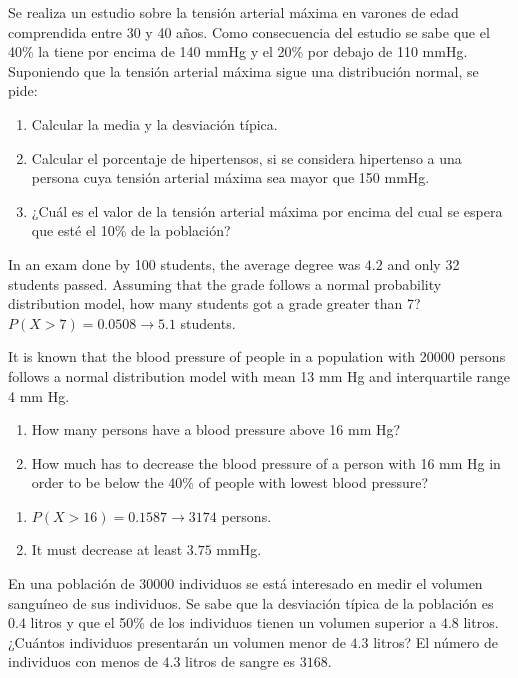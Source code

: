 {Se realiza un estudio sobre la tensión arterial máxima en varones de edad comprendida entre 30 y 40 años. Como
consecuencia del estudio se sabe que el 40\% la tiene por encima de 140 mmHg y el 20\% por debajo de 110 mmHg.
Suponiendo que la tensión arterial máxima sigue una distribución normal, se pide:
\begin{enumerate}
\item Calcular la media y la desviación típica.
\item Calcular el porcentaje de hipertensos, si se considera hipertenso a una persona cuya tensión arterial máxima sea mayor que 150 mmHg.
\item ¿Cuál es el valor de la tensión arterial máxima por encima del cual se espera que esté el 10\% de la población?
\end{enumerate}
}
{}
{}


{In an exam done by 100 students, the average degree was $4.2$ and only 32 students passed.
Assuming that the grade follows a normal probability distribution model, how many students got a grade greater than 7?
}
{$P(X>7)=0.0508\rightarrow 5.1$ students.
}
{}


{It is known that the blood pressure of people in a population with 20000 persons follows a normal distribution
model with mean 13 mm Hg and interquartile range 4 mm Hg.
\begin{enumerate}
\item How many persons have a blood pressure above 16 mm Hg?
\item How much has to decrease the blood pressure of a person with 16 mm Hg in order to be below the 40\% of
people with lowest blood pressure?
\end{enumerate}
}
{
\begin{enumerate}
\item $P(X>16)=0.1587 \rightarrow 3174$ persons.
\item It must decrease at least $3.75$ mmHg.
\end{enumerate}
}
{}


{En una población de 30000 individuos se está interesado en medir el volumen sanguíneo de sus individuos.
Se sabe que la desviación típica de la población es $0.4$ litros y que el 50\% de los individuos tienen un volumen
superior a $4.8$ litros.
¿Cuántos individuos presentarán un volumen menor de $4.3$ litros?}
{El número de individuos con menos de $4.3$ litros de sangre es $3168$.}
{}


